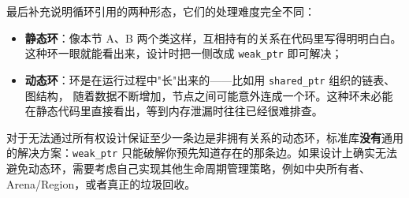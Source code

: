 最后补充说明循环引用的两种形态，它们的处理难度完全不同：

\begin{itemize}
\item \textbf{静态环}：像本节 A、B 两个类这样，互相持有的关系在代码里写得明明白白。
这种环一眼就能看出来，设计时把一侧改成 \texttt{weak\_ptr} 即可解决；
\item \textbf{动态环}：环是在运行过程中"长"出来的——比如用 \texttt{shared\_ptr} 组织的链表、图结构，
随着数据不断增加，节点之间可能意外连成一个环。这种环未必能在静态代码里直接看出，等到内存泄漏时往往已经很难排查。
\end{itemize}

\begin{note}
对于无法通过所有权设计保证至少一条边是非拥有关系的动态环，标准库\textbf{没有}通用的解决方案：\texttt{weak\_ptr} 只能破解你预先知道存在的那条边。如果设计上确实无法避免动态环，需要考虑自己实现其他生命周期管理策略，例如中央所有者、Arena/Region，或者真正的垃圾回收。
\end{note}
